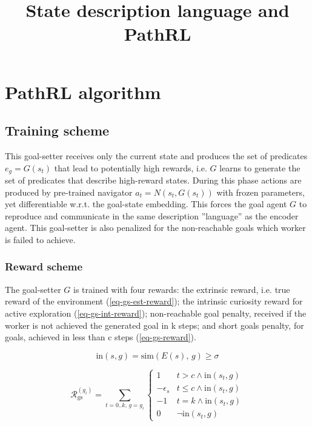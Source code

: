 \documentclass[acmsmall, nonacm]{acmart}
\title{State description language and PathRL}
\begin{document}
\maketitle

\section{PathRL algorithm}

\subsection{Training scheme}

This goal-setter receives only the current state and produces the set of predicates $e_g = G(s_t)$ that lead to potentially high rewards, i.e. $G$ learns to generate the set of predicates that describe high-reward states. During this phase actions are produced by pre-trained navigator $a_t = N(s_t, G(s_t))$ with frozen parameters, yet differentiable w.r.t. the goal-state embedding. This forces the goal agent $G$ to reproduce and communicate in the same description ''language'' as the encoder agent. This goal-setter is also penalized for the non-reachable goals which worker is failed to achieve.

\subsubsection{Reward scheme}

The goal-setter $G$ is trained with four rewards: the extrinsic reward, i.e. true reward of the environment (\ref{eq-gs-est-reward}); the intrinsic curiosity reward for active exploration (\ref{eq-gs-int-reward}); non-reachable goal penalty, received if the worker is not achieved the generated goal in k steps; and short goals penalty, for goals, achieved in less than c steps (\ref{eq-gs-reward}).

\begin{equation}
\mathrm{in}(s, g) = \mathrm{sim}(E(s),\, g) \ge \sigma
\end{equation}

\begin{equation} \label{eq-gs-reward}
\mathcal{R}_\mathrm{gs}^{(g_i)} = \sum_{t=0..k,\, g=g_i}
\begin{cases}
1 & t > c \land \mathrm{in}(s_t, g) \\
-\epsilon_s & t \le c \land \mathrm{in}(s_t, g) \\
-1 & t=k \land \mathrm{in}(s_t, g) \\
0 & \lnot \mathrm{in}(s_t, g)
\end{cases}
\end{equation}
\end{document}
